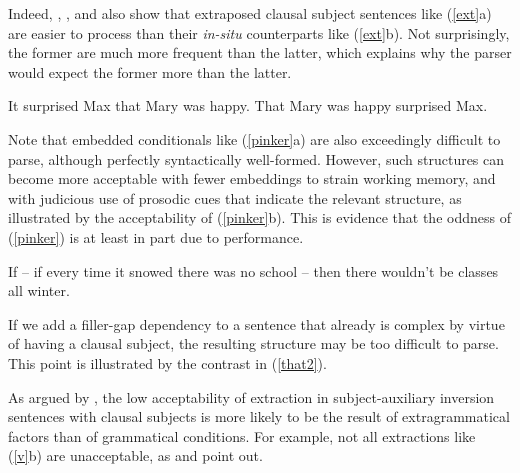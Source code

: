 \documentclass[output=paper
	        ,collection
	        ,collectionchapter
 	        ,biblatex
                ,babelshorthands
                ,newtxmath
                ,draftmode
                ,colorlinks, citecolor=brown
]{langscibook}
\begin{document}
\eal  \label{exps}
\zl


\noindent
  Indeed, \citet{fodor67},  \citet{bever}, and \citet{frazier88} also
 show that extraposed clausal subject sentences
 like (\ref{ext}a) are easier to process than
their \textit{in-situ} counterparts like (\ref{ext}b). 
Not surprisingly,  the former are much more frequent than the latter,
which  explains why the parser would expect the former more than the latter.


\eal  \label{ext}
\ex It surprised Max that Mary was happy. 
\ex That Mary was happy surprised Max.
\zl






\noindent
Note that embedded conditionals like (\ref{pinker}a) are also exceedingly 
difficult to parse, although perfectly syntactically well-formed.
However,   such structures can become more acceptable with fewer embeddings to strain
working memory, and with judicious use of prosodic cues that indicate  the relevant structure, as illustrated by  the acceptability of (\ref{pinker}b).
This is  evidence that the oddness of (\ref{pinker}) is
at least in part due to performance. 


\ea \label{pinker} If -- if every time it snowed there was no school -- then there wouldn't be classes all winter.
\z 


  
  
  
  If we add a filler-gap dependency to a sentence that already is complex by
  virtue of having  a clausal  subject, the resulting structure
  may be too difficult to parse.  This   point is illustrated by
  the contrast in (\ref{that2}).



\eal \label{that2}
\zl


\noindent
As argued by \citet{dubinsky2009}, the low acceptability
 of extraction in subject-auxiliary inversion sentences with clausal subjects 
  is more likely to be the result of extragrammatical factors than of grammatical conditions.
For example,  not all extractions like (\ref{v}b) are unacceptable, as
\citet[382--387]{delahunty} and
\citet[115]{dubinsky2009} point out. 
\end{document}
